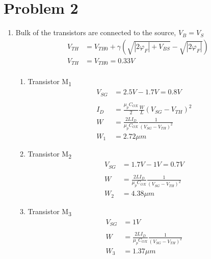 \documentclass{article}
\begin{document}
\section{Problem 2}
\label{sec:org6bed224}
\begin{enumerate}
\item Bulk of the transistors are connected to the source, \(V_{B} = V_{S}\)
\begin{equation*}
\begin{aligned}
V_{TH} &= V_{TH0} + \gamma{}(\sqrt{|2\varphi_{F}| + V_{BS}} - \sqrt{|2\varphi_{F}|}) \\
V_{TH} &= V_{TH0} = 0.33 V \\
\end{aligned}
\end{equation*}
\begin{enumerate}
\item Transistor M\textsubscript{1}
\begin{equation*}
\begin{aligned}
V_{SG} &= 2.5V - 1.7 V  = 0.8 V \\
\\
I_{D} &= \frac{\mu_{p}C_{OX}}{2}\frac{W}{L}(V_{SG} - V_{TH})^{2} \\
W &= \frac{2LI_{D}}{\mu_{p}C_{OX}}\frac{1}{(V_{SG} - V_{TH})^{2}} \\
W_{1} &= 2.72 \mu{}m
\end{aligned}
\end{equation*}

\item Transistor M\textsubscript{2}
\begin{equation*}
\begin{aligned}
V_{SG} &= 1.7 V - 1 V  = 0.7 V \\
\\
W &= \frac{2LI_{D}}{\mu_{p}C_{OX}}\frac{1}{(V_{SG} - V_{TH})^{2}} \\
W_{2} &= 4.38 \mu{}m
\end{aligned}
\end{equation*}

\item Transistor M\textsubscript{3}
\begin{equation*}
\begin{aligned}
V_{SG} &= 1 V \\
\\
W &= \frac{2LI_{D}}{\mu_{p}C_{OX}}\frac{1}{(V_{SG} - V_{TH})^{2}} \\
W_{3} &= 1.37 \mu{}m
\end{aligned}
\end{equation*}
\end{enumerate}


\end{enumerate}
\end{document}
